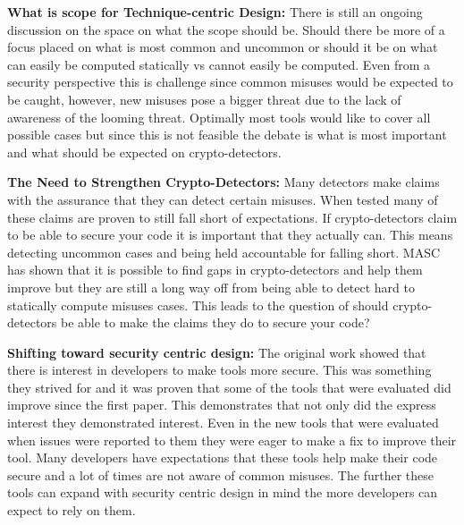 \textbf{What is scope for Technique-centric Design:}
There is still an ongoing discussion on the space on what the scope should be. Should there be more of a focus placed on what is most common and uncommon or should it be on what can easily be computed statically vs cannot easily be computed. Even from a security perspective this is challenge since common misuses would be expected to be caught, however, new misuses pose a bigger threat due to the lack of awareness of the looming threat. Optimally most tools would like to cover all possible cases but since this is not feasible the debate is what is most important and what should be expected on crypto-detectors.

\textbf{The Need to Strengthen Crypto-Detectors:}
Many detectors make claims with the assurance that they can detect certain misuses. When tested many of these claims are proven to still fall short of expectations. If crypto-detectors claim to be able to secure your code it is important that they actually can. This means detecting uncommon cases and being held accountable for falling short. MASC has shown that it is possible to find gaps in crypto-detectors and help them improve but they are still a long way off from being able to detect hard to statically compute misuses cases. This leads to the question of should crypto-detectors be able to make the claims they do to secure your code?

\textbf{Shifting toward security centric design:}
The original work showed that there is interest in developers to make tools more secure. This was something they strived for and it was proven that some of the tools that were evaluated did improve since the first paper. This demonstrates that not only did the express interest they demonstrated interest. Even in the new tools that were evaluated when issues were reported to them they were eager to make a fix to improve their tool. Many developers have expectations that these tools help make their code secure and a lot of times are not aware of common misuses. The further these tools can expand with security centric design in mind the more developers can expect to rely on them.


